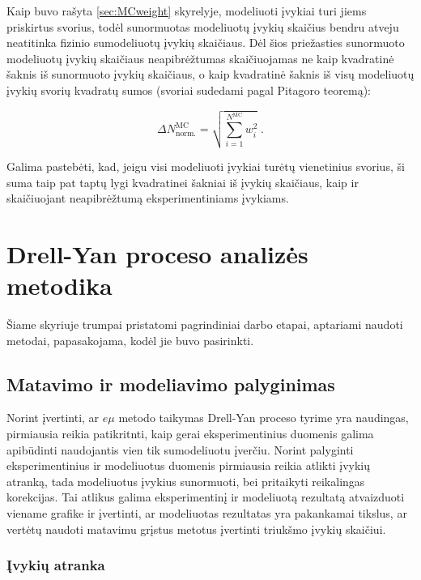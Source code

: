 \documentclass[a4paper, 12pt]{article}
\newcommand{\emu}{e\mu}
\newlength\q
\begin{document}
Kaip buvo rašyta \ref{sec:MCweight} skyrelyje, modeliuoti įvykiai turi jiems priskirtus svorius, todėl sunormuotas modeliuotų įvykių
skaičius bendru atveju neatitinka fizinio sumodeliuotų įvykių skaičiaus.
Dėl šios priežasties sunormuoto modeliuotų įvykių skaičiaus neapibrėžtumas skaičiuojamas ne kaip kvadratinė šaknis iš
sunormuoto įvykių skaičiaus, o kaip kvadratinė šaknis iš visų modeliuotų įvykių svorių kvadratų sumos (svoriai sudedami
pagal Pitagoro teoremą):

\begin{equation}
	\Delta N^{\mathrm{MC}}_{\mathrm{norm.}} = \sqrt{\sum_{i=1}^{N^{\mathrm{MC}}}w_{i}^{2}} \; .
	\label{eq:Sumw2Unc}
\end{equation}

Galima pastebėti, kad, jeigu visi modeliuoti įvykiai turėtų vienetinius svorius, ši suma taip pat taptų lygi kvadratinei
šakniai iš įvykių skaičiaus, kaip ir skaičiuojant neapibrėžtumą eksperimentiniams įvykiams.

\clearpage
\section{Drell-Yan proceso analizės metodika}

Šiame skyriuje trumpai pristatomi pagrindiniai darbo etapai, aptariami naudoti metodai, papasakojama, kodėl jie buvo pasirinkti.

\subsection{Matavimo ir modeliavimo palyginimas}

Norint įvertinti, ar $\emu$ metodo taikymas Drell-Yan proceso tyrime yra naudingas, pirmiausia reikia patikritnti, kaip
gerai eksperimentinius duomenis galima apibūdinti naudojantis vien tik sumodeliuotu įverčiu.
Norint palyginti eksperimentinius ir modeliuotus duomenis pirmiausia reikia atlikti įvykių atranką, tada modeliuotus
įvykius sunormuoti, bei pritaikyti reikalingas korekcijas.
Tai atlikus galima eksperimentinį ir modeliuotą rezultatą atvaizduoti viename grafike ir įvertinti, ar modeliuotas
rezultatas yra pakankamai tikslus, ar vertėtų naudoti matavimu grįstus metotus įvertinti triukšmo įvykių skaičiui.

\subsubsection{Įvykių atranka}
\end{document}
